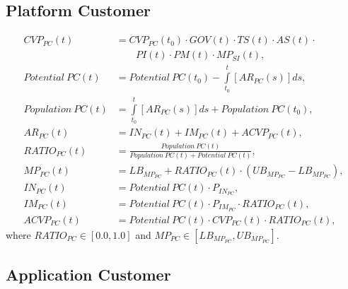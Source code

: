 \subsection{Platform Customer}\label{ch:app04:csf:pc}

\begin{align}
		CVP_ {PC}(t) &= CVP_{PC}(t_0) \cdot GOV(t) \cdot TS(t) \cdot AS(t) \cdot \nonumber \\ &\qquad PI(t) \cdot PM(t) \cdot MP_{SI}(t),\\
		\mathit{Potential~PC(t)} &= \mathit{Potential~PC(t_0)} - \int\limits_{t_0}^t  [AR_{PC}(s)]ds,\\
		\mathit{Population~PC(t)} &= \int\limits_{t_0}^t [AR_{PC}(s)]ds + \mathit{Population~PC(t_0)},\\
		AR_{PC}(t) &= IN_{PC}(t) + IM_{PC}(t) + ACVP_{PC}(t),\\
		RATIO_{PC}(t) &= \frac{\mathit{Population~PC(t)}}{\mathit{Population~PC(t)} + \mathit{Potential~PC(t)}},\\
		MP_{PC}(t) &= LB_{MP_{PC}} + RATIO_{PC}(t) \cdot (UB_{MP_{PC}} - LB_{MP_{PC}}),\\
		IN_{PC}(t) &= \mathit{Potential~PC(t)} \cdot P_{IN_{PC}},\\
		IM_{PC}(t) &= \mathit{Potential~PC(t)} \cdot P_{IM_{PC}} \cdot RATIO_{PC}(t),\\
		ACVP_{PC}(t) &= \mathit{Potential~PC(t)} \cdot CVP_{PC}(t) \cdot RATIO_{PC}(t),
\end{align}
where $RATIO_{PC} \in [0.0,1.0]$ and $MP_{PC} \in [LB_{MP_{PC}},UB_{MP_{PC}}]$.

\subsection{Application Customer}\label{ch:app04:csf:ac}

